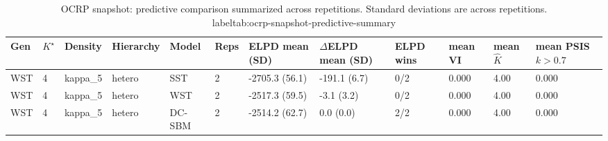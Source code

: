 \begin{table}[!h]
\centering
\caption{OCRP snapshot: predictive comparison summarized across repetitions. Standard deviations are across repetitions.\\label{tab:ocrp-snapshot-predictive-summary}}
\centering
\begin{tabular}[t]{llllllllllll}
\toprule
Gen & $K^\star$ & Density & Hierarchy & Model & Reps & ELPD mean (SD) & $\Delta$ELPD mean (SD) & ELPD wins & mean VI & mean $\hat K$ & mean PSIS $k>0.7$\\
\midrule
WST & 4 & kappa_5 & hetero & SST & 2 & -2705.3 (56.1) & -191.1 (6.7) & 0/2 & 0.000 & 4.00 & 0.000\\
WST & 4 & kappa_5 & hetero & WST & 2 & -2517.3 (59.5) & -3.1 (3.2) & 0/2 & 0.000 & 4.00 & 0.000\\
WST & 4 & kappa_5 & hetero & DC-SBM & 2 & -2514.2 (62.7) & 0.0 (0.0) & 2/2 & 0.000 & 4.00 & 0.000\\
\bottomrule
\end{tabular}
\end{table}
